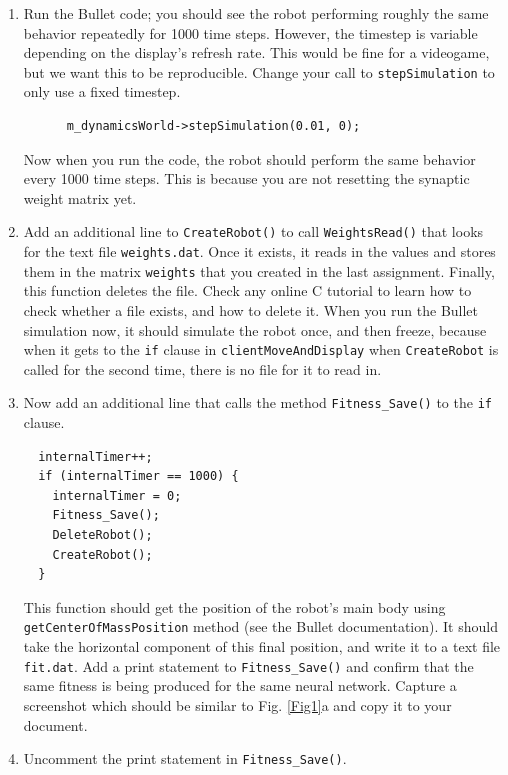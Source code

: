 \documentclass[12pt]{article}
\begin{document}
\begin{enumerate}
\item Run the Bullet code; you should see the robot performing roughly the same behavior repeatedly for 1000 time steps. However, the timestep is variable depending on the display's refresh rate.  This would be fine for a videogame, but we want this to be reproducible.  Change your call to \verb|stepSimulation| to only use a fixed timestep.
\begin{verbatim}
      m_dynamicsWorld->stepSimulation(0.01, 0);
\end{verbatim}
Now when you run the code, the robot should perform the same behavior every 1000 time steps.  This is because you are not resetting the synaptic weight matrix yet.

\item Add an additional line to \texttt{CreateRobot()} to call \texttt{WeightsRead()}
that looks for the text file \texttt{weights.dat}. Once it exists, it reads in the values and stores them in the matrix \texttt{weights} that you created in the last assignment. Finally, this function deletes the file. Check any online C tutorial to learn how to check whether a file exists, and how to delete it. When you run the Bullet simulation now, it should simulate the robot once, and then freeze, because when it gets to the \texttt{if} clause in \texttt{clientMoveAndDisplay} when \texttt{CreateRobot} is called for the second time, there is no file for it to read in.

\item Now add an additional line that calls the method \texttt{Fitness\_Save()} to the \texttt{if} clause. 
\begin{verbatim}
  internalTimer++;
  if (internalTimer == 1000) {
    internalTimer = 0;
    Fitness_Save();
    DeleteRobot();
    CreateRobot();
  }
\end{verbatim}

This function should get the position of the robot's main body using \\
\texttt{getCenterOfMassPosition} method (see the Bullet documentation). It should take the horizontal component of this final position, and write it to a text file \texttt{fit.dat}.  Add a print statement to \verb|Fitness_Save()| and confirm that the same fitness is being produced for the same neural network.  Capture a screenshot which should be similar to Fig. \ref{Fig1}a and copy it to your document.

\item Uncomment the print statement in \verb|Fitness_Save()|.


\end{enumerate}
\end{document}

